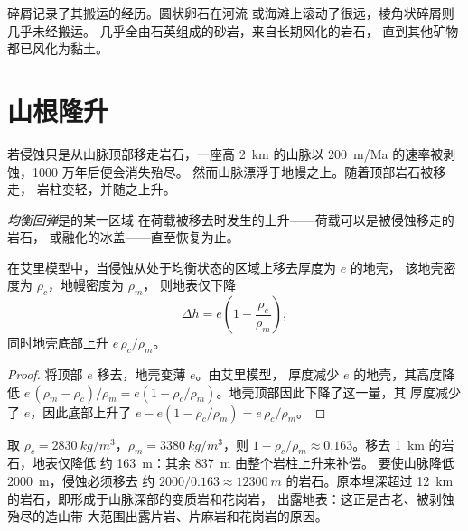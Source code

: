 碎屑记录了其搬运的经历。圆状卵石在河流
或海滩上滚动了很远，棱角状碎屑则几乎未经搬运。
几乎全由石英组成的砂岩，来自长期风化的岩石，
直到其他矿物都已风化为黏土。

\section{山根隆升}

若侵蚀只是从山脉顶部移走岩石，一座高 \qty{2}{km}
的山脉以 \qty{200}{m/Ma} 的速率被剥蚀，1000 万年后便会消失殆尽。
然而山脉漂浮于地幔之上。随着顶部岩石被移走，
岩柱变轻，并随之上升。

\begin{definition}[均衡回弹]\label{def:g12:destruction-of-mountains:rebound}
\emph{均衡回弹}是的某一区域
在荷载被移去时发生的上升——荷载可以是被侵蚀移走的岩石，
或融化的冰盖——直至恢复为止。
\end{definition}

\begin{proposition}[侵蚀与回弹]\label{prop:g12:destruction-of-mountains:rebound}
在艾里模型中，当侵蚀从处于均衡状态的区域上移去厚度为 $e$ 的地壳，
该地壳密度为 $\rho_c$，地幔密度为 $\rho_m$，
则地表仅下降
\[
  \Delta h = e\left(1 - \frac{\rho_c}{\rho_m}\right),
\]
同时地壳底部上升 $e\,\rho_c/\rho_m$。
\end{proposition}

\begin{proof}
将顶部 $e$ 移去，地壳变薄 $e$。由艾里模型，
厚度减少 $e$ 的地壳，其高度降低 $e\,(\rho_m - \rho_c)/\rho_m = e(1 -
\rho_c/\rho_m)$。地壳顶部因此下降了这一量，其
厚度减少了 $e$，因此底部上升了 $e - e(1 -
\rho_c/\rho_m) = e\,\rho_c/\rho_m$。
\end{proof}

取 $\rho_c = \qty{2830}{kg/m^3}$，$\rho_m = \qty{3380}{kg/m^3}$，则 $1 -
\rho_c/\rho_m \approx 0.163$。移去 \qty{1}{km} 的岩石，地表仅降低
约 \qty{163}{m}：其余 \qty{837}{m} 由整个岩柱上升来补偿。
要使山脉降低 \qty{2000}{m}，侵蚀必须移去
约 $2000/0.163 \approx \qty{12300}{m}$ 的岩石。原本埋深超过
\qty{12}{km} 的岩石，即形成于山脉深部的变质岩和花岗岩，
出露地表：这正是古老、被剥蚀殆尽的造山带
大范围出露片岩、片麻岩和花岗岩的原因。

